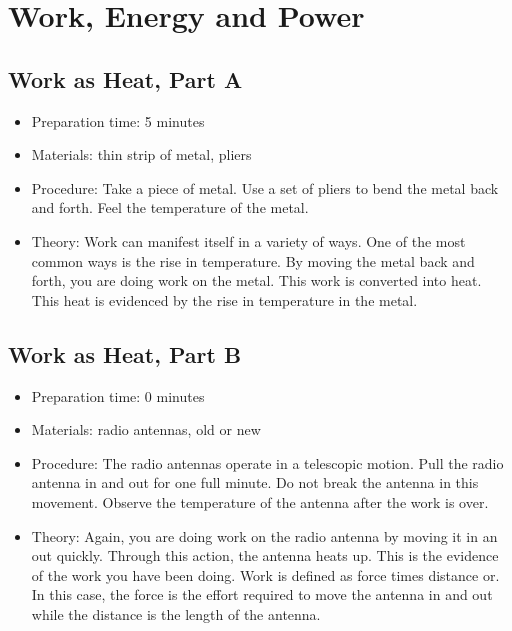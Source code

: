 \section{Work, Energy and Power}



\subsection{Work as Heat, Part A}
\begin{itemize}
\item{Preparation time: 5 minutes}
\item{Materials: thin strip of metal, pliers}
\item{Procedure: Take a piece of metal. Use a set of pliers to bend the metal back and forth. Feel the temperature of the metal.}
\item{Theory: Work can manifest itself in a variety of ways. One of the most common ways is the rise in temperature. By moving the metal back and forth, you are doing work on the metal. This work is converted into heat. This heat is evidenced by the rise in temperature in the metal. }
\end{itemize}

\subsection{Work as Heat, Part B}
\begin{itemize}
\item{Preparation time: 0 minutes}
\item{Materials: radio antennas, old or new }
\item{Procedure: The radio antennas operate in a telescopic motion. Pull the radio antenna in and out for one full minute. Do not break the antenna in this movement. Observe the temperature of the antenna after the work is over.}
\item{Theory: Again, you are doing work on the radio antenna by moving it in an out quickly. Through this action, the antenna heats up. This is the evidence of the work you have been doing. Work is defined as force times distance or. In this case, the force is the effort required to move the antenna in and out while the distance is the length of the antenna.}
\end{itemize}

